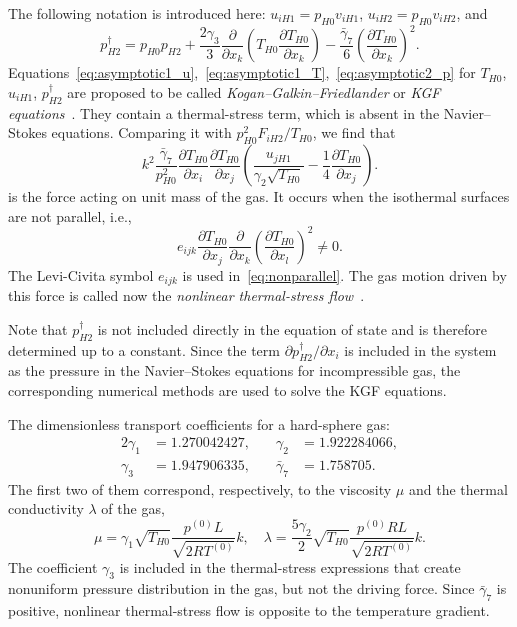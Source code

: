 \documentclass[10pt]{article}
\newcommand{\pder}[2][]{\frac{\partial#1}{\partial#2}}
\begin{document}
The following notation is introduced here: \(u_{iH1} = p_{H0}v_{iH1}\), \(u_{iH2} = p_{H0}v_{iH2}\), and
\begin{equation}\label{eq:dag_pressure}
    p_{H2}^\dag = p_{H0} p_{H2}
        + \frac{2\gamma_3}{3}\pder{x_k}\left(T_{H0}\pder[T_{H0}]{x_k}\right)
        - \frac{\bar{\gamma}_7}{6}\left(\pder[T_{H0}]{x_k}\right)^2.
\end{equation}
Equations~\eqref{eq:asymptotic1_u},~\eqref{eq:asymptotic1_T},~\eqref{eq:asymptotic2_p}
for \(T_{H0}\), \(u_{iH1}\), \(p_{H2}^\dag\) are proposed
to be called \emph{Kogan--Galkin--Friedlander} or \emph{KGF equations}~\cite{Kogan1976}.
They contain a thermal-stress term, which is absent in the Navier--Stokes equations.
Comparing it with \(p_{H0}^2F_{iH2}/T_{H0}\), we find that
\begin{equation}\label{eq:gamma7_force}
    k^2\frac{\bar{\gamma}_7}{p_{H0}^2}\pder[T_{H0}]{x_i}\pder[T_{H0}]{x_j}\left(\frac{u_{jH1}}{\gamma_2\sqrt{T_{H0}}} - \frac{1}4\pder[T_{H0}]{x_j}\right).
\end{equation}
is the force acting on unit mass of the gas.
It occurs when the isothermal surfaces are not parallel, i.e.,
\begin{equation}\label{eq:nonparallel}
    e_{ijk}\pder[T_{H0}]{x_j}\pder{x_k}\left(\pder[T_{H0}]{x_l}\right)^2 \ne 0.
\end{equation}
The Levi-Civita symbol \(e_{ijk}\) is used in~\eqref{eq:nonparallel}.
The gas motion driven by this force is called now the \emph{nonlinear thermal-stress flow}~\cite{Sone2002,Sone2007}.

Note that \(p_{H2}^\dag\) is not included directly in the equation of state and is therefore determined up to a constant.
Since the term \(\partial{p_{H2}^\dag}/\partial{x_i}\) is included in the system as the pressure
in the Navier--Stokes equations for incompressible gas,
the corresponding numerical methods are used to solve the KGF equations.

The dimensionless transport coefficients for a hard-sphere gas:
\begin{alignat*}{2}\label{eq:gamma_coeffs}
    \gamma_1 &= 1.270042427, &\quad \gamma_2 &= 1.922284066, \\
    \gamma_3 &= 1.947906335, &\quad \bar{\gamma}_7 &= 1.758705.
\end{alignat*}
The first two of them correspond, respectively, to the viscosity \(\mu\) and the thermal conductivity \(\lambda\) of the gas,
\begin{equation}\label{eq:mu_lambda}
    \mu = \gamma_1\sqrt{T_{H0}} \frac{p^{(0)}L}{\sqrt{2RT^{(0)}}} k, \quad
    \lambda = \frac{5\gamma_2}{2}\sqrt{T_{H0}} \frac{p^{(0)}RL}{\sqrt{2RT^{(0)}}} k.
\end{equation}
The coefficient \(\gamma_3\) is included in the thermal-stress expressions
that create nonuniform pressure distribution in the gas, but not the driving force.
Since \(\bar{\gamma}_7\) is positive, nonlinear thermal-stress flow is opposite to the temperature gradient.
\end{document}

